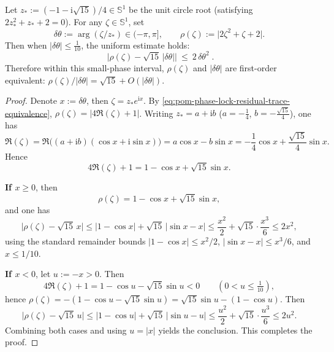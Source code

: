

\begin{proposition}\label{prop:pom-phase-residual-linearization-sqrt15}
Let \(z_\ast:=(-1-\mathrm{i}\sqrt{15})/4\in\mathbb{S}^1\) be the unit circle root (satisfying \(2z_\ast^2+z_\ast+2=0\)).
For any \(\zeta\in\mathbb{S}^1\), set
\[
\delta\theta:=\arg(\zeta/z_\ast)\in(-\pi,\pi],
\qquad
\rho(\zeta):=\bigl|2\zeta^2+\zeta+2\bigr|.
\]
Then when \(|\delta\theta|\le \tfrac{1}{10}\), the uniform estimate holds:
\[
\boxed{\;
\bigl|\rho(\zeta)-\sqrt{15}\,|\delta\theta|\bigr|\ \le\ 2\,\delta\theta^{2}\; }.
\]
Therefore within this small-phase interval, \(\rho(\zeta)\) and \(|\delta\theta|\) are first-order equivalent:
\(
\rho(\zeta)/|\delta\theta|=\sqrt{15}+O(|\delta\theta|)
\).
\end{proposition}
\begin{proof}
Denote \(x:=\delta\theta\), then \(\zeta=z_\ast e^{\mathrm{i}x}\).
By \eqref{eq:pom-phase-lock-residual-trace-equivalence}, \(\rho(\zeta)=|4\Re(\zeta)+1|\).
Writing \(z_\ast=a+\mathrm{i}b\) (\(a=-\tfrac14\), \(b=-\tfrac{\sqrt{15}}{4}\)), one has
\[
\Re(\zeta)=\Re\bigl((a+\mathrm{i}b)(\cos x+\mathrm{i}\sin x)\bigr)=a\cos x-b\sin x
=-\frac14\cos x+\frac{\sqrt{15}}{4}\sin x.
\]
Hence
\[
4\Re(\zeta)+1=1-\cos x+\sqrt{15}\sin x.
\]
\par
\textbf{If \(x\ge 0\)}, then
\[
\rho(\zeta)=1-\cos x+\sqrt{15}\sin x,
\]
and one has
\[
\bigl|\rho(\zeta)-\sqrt{15}\,x\bigr|
\le |1-\cos x|+\sqrt{15}\,|\sin x-x|
\le \frac{x^2}{2}+\sqrt{15}\cdot\frac{x^3}{6}
\le 2x^2,
\]
using the standard remainder bounds \(|1-\cos x|\le x^2/2\), \(|\sin x-x|\le x^3/6\), and \(x\le 1/10\).
\par
\textbf{If \(x<0\)}, let \(u:=-x>0\). Then
\[
4\Re(\zeta)+1=1-\cos u-\sqrt{15}\sin u<0\qquad(0<u\le\tfrac{1}{10}),
\]
hence \(\rho(\zeta)=-(1-\cos u-\sqrt{15}\sin u)=\sqrt{15}\sin u-(1-\cos u)\).
Then
\[
\bigl|\rho(\zeta)-\sqrt{15}\,u\bigr|
\le |1-\cos u|+\sqrt{15}\,|\sin u-u|
\le \frac{u^2}{2}+\sqrt{15}\cdot\frac{u^3}{6}
\le 2u^2.
\]
Combining both cases and using \(u=|x|\) yields the conclusion. This completes the proof.
\end{proof}

